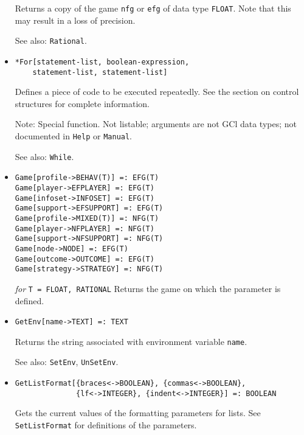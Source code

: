 \begin{itemize}
\bd
Returns a copy of the game \verb+nfg+ or \verb+efg+ of data type 
\verb+FLOAT+. Note that this may result in a loss of precision.  
\item [See also:] \verb+Rational+.
\ed

\item{}
\protect \large \begin{verbatim}
*For[statement-list, boolean-expression, 
    statement-list, statement-list]
\end{verbatim}\normalsize

\bd
Defines a piece of code to be executed repeatedly.  See the section
on control structures for complete information.
\item [Note:] Special function.  Not listable; arguments are not GCl
data types; not documented in \verb+Help+ or \verb+Manual+.  
\item
[See also:] \verb+While+.
\ed


\item{}
\protect \large \begin{verbatim}
Game[profile->BEHAV(T)] =: EFG(T)
Game[player->EFPLAYER] =: EFG(T)
Game[infoset->INFOSET] =: EFG(T)
Game[support->EFSUPPORT] =: EFG(T)
Game[profile->MIXED(T)] =: NFG(T)
Game[player->NFPLAYER] =: NFG(T)
Game[support->NFSUPPORT] =: NFG(T)
Game[node->NODE] =: EFG(T)
Game[outcome->OUTCOME] =: EFG(T)
Game[strategy->STRATEGY] =: NFG(T)
\end{verbatim} \normalsize

{\it for} {\tt T = FLOAT, RATIONAL}
\bd
Returns the game on which the parameter is defined.
\ed

\item{}
\protect \large \begin{verbatim}
GetEnv[name->TEXT] =: TEXT
\end{verbatim} \normalsize

\bd
Returns the string associated with environment variable \verb+name+.
\item [See also:] \verb+SetEnv+, \verb+UnSetEnv+.
\ed


\item{}
\protect \large \begin{verbatim}
GetListFormat[{braces<->BOOLEAN}, {commas<->BOOLEAN},
              {lf<->INTEGER}, {indent<->INTEGER}] =: BOOLEAN
\end{verbatim} \normalsize

\bd
Gets the current values of the formatting parameters for lists.  See
\verb+SetListFormat+ for definitions of the parameters. 
\ed


\end{itemize}
